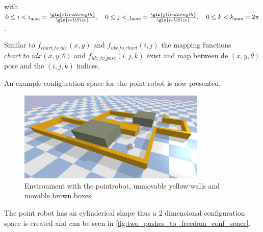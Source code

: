 with $0 \leq i < i_{\textrm{max}} = \frac{\gls{xGridLength}}{\gls{cellSize}}, \quad 0 \leq j < j_{\textrm{max}} = \frac{\gls{yGridLength}}{\gls{cellSize}}, \quad 0 \leq k < k_{\textrm{max}} = 2\pi$.\bs

Similar to $f_\mathit{chart\_to\_idx}(x, y)$ and $f_\mathit{idx\_to\_chart}(i,j)$ the mapping functions $\mathit{chart\_to\_idx}(x, y, \theta)$ and $f_\mathit{idx\_to\_pose}(i, j, k)$ exist and map between de $(x, y, \theta)$ pose and the $(i, j, k)$ indices.\bs

An example configuration space for the point robot is now presented.
\begin{figure}[H]
    \centering
    \includegraphics[width=0.8\textwidth]{figures/planning/two_push_to_freedom_env}
    \caption{Environment with the pointrobot, unmovable yellow walls and movable brown boxes.}%
    \label{fig:two_pushes_to_freedom_env}
\end{figure}

The point robot has an cylinderical shape thus a 2 dimensional configuration space is created and can be seen in \cref{fig:two_pushes_to_freedom_conf_space}.

